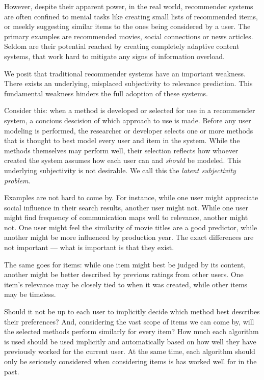 However, despite their apparent power, in the real world, recommender systems are often confined
to menial tasks like creating small lists of recommended items, 
or meekly suggesting similar items to the ones being considered by a user.
The primary examples are recommended movies, social connections or news articles.
Seldom are their potential reached by creating completely adaptive
content systems, that work hard to mitigate any signs of information overload.

We posit that traditional recommender systems have an important weakness.
There exists an underlying, misplaced subjectivity to relevance prediction.
This fundamental weakness hinders the full adoption of these systems.

Consider this: 
when a method is developed or selected for use in a recommender system,
a concious descision of which approach to use is made.
Before any user modeling is performed, the researcher or developer selects
one or more methods that is thought to best model every user and item in the system.
While the methods themselves may perform well, their selection
reflects how whoever created the system assumes how each user
can and \emph{should} be modeled. This underlying subjectivity is not desirable.
We call this the \emph{latent subjectivity problem}.

Examples are not hard to come by.
For instance, while one user might appreciate social
influence in their search results, another user might not.
While one user might find frequency of communication maps well to relevance,
another might not. 
One user might feel the similarity of movie titles are a good predictor,
while another might be more influenced by production year.
The exact differences are not important --- what is important is that they exist.

The same goes for items: while one item might best be judged by its content,
another might be better described by previous ratings from other users.
One item's relevance may be closely tied to when it was created,
while other items may be timeless.

Should it not be up to each user to implicitly decide which method best describes their preferences?
And, considering the vast scope of items we can come by, will the selected
methods perform similarly for every item?
How much each algorithm is used should be used implicitly and automatically
based on how well they have previously worked for the current user.
At the same time, each algorithm should only be seriously considered
when considering items is has worked well for in the past.


